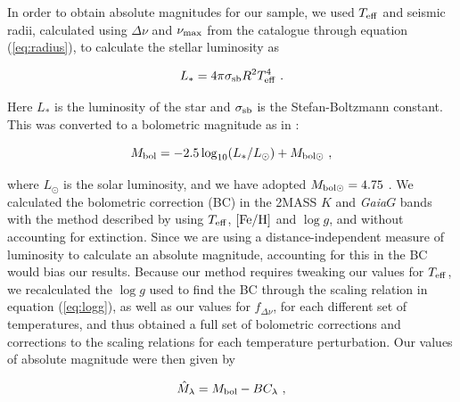 \documentclass[fleqn,usenatbib]{mnras}
\newcommand{\numax}{\mbox{$\nu_{\rm max}$}\xspace}
\newcommand{\fdnu}{\mbox{$f_{\Delta\nu}$}\xspace}
\newcommand{\dnu}{\mbox{$\Delta \nu$}\xspace}
\newcommand{\teff}{\mbox{$T_{\rm eff}$}\xspace}
\newcommand{\logg}{\mbox{$\log g$}\xspace}
\newcommand{\feh}{\mbox{$\rm{[Fe/H]}$}\xspace}
\newcommand{\gaia}{\emph{Gaia}\xspace}
\newcommand{\new}[1]{#1}
\newcommand{\up}[1]{#1}
\begin{document}
In order to obtain absolute magnitudes for our sample, we used \teff and seismic radii, calculated using \dnu and \numax from the  catalogue through equation (\ref{eq:radius}), to calculate the stellar luminosity as

\begin{equation}
L_* = 4\pi\sigma_{\rm sb}R^2T_{\rm eff}^4\ .
\end{equation}

\noindent Here $L_*$ is the luminosity of the star and $\sigma_{\rm{sb}}$ is the Stefan-Boltzmann constant. This was converted to a bolometric magnitude as in \cite{art:casagrande+vandenberg2014}:

\begin{equation}
M_{\rm bol} = -2.5\log_{10}(L_* / L_\odot) + M_{\rm bol \odot}\ ,
\end{equation}


\noindent where $L_\odot$ is the solar luminosity, and we have adopted $M_{\rm bol \odot} = 4.75$ \citep{art:casagrande+vandenberg2014,art:casagrande+vandenberg2018b,art:casagrande+vandenberg2018}. We calculated the bolometric correction (BC) in the 2MASS $K$ and \gaia $G$ bands with the method described by \cite{art:casagrande+vandenberg2014,art:casagrande+vandenberg2018b,art:casagrande+vandenberg2018} using \teff, \feh and \logg, and without accounting for extinction. \up{Since we are using a distance-independent measure of luminosity to calculate an absolute magnitude}, accounting for this in the BC would bias our results. Because our method requires tweaking our values for \teff, we recalculated the \logg used to find the BC through the scaling relation in equation (\ref{eq:logg}), \up{as well as our values for \fdnu,} for each different set of temperatures, and thus obtained a full set of bolometric corrections \up{and corrections to the scaling relations} for each temperature perturbation. Our values of absolute magnitude were then given by

\begin{equation}
\hat{M}_\lambda = M_{\rm bol} - BC_\lambda\ ,
\end{equation}
\end{document}
